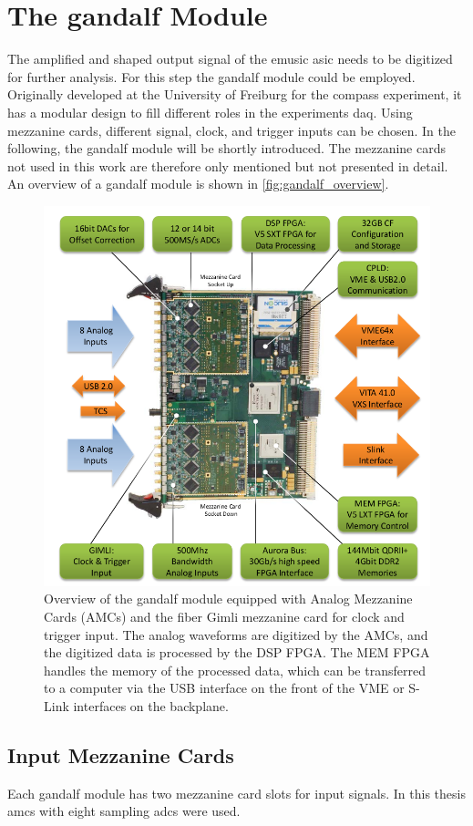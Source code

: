 \section{The \ac{gandalf} Module}
The amplified and shaped output signal of the \ac{emusic} \ac{asic} needs to be digitized for further analysis.
For this step the \ac{gandalf} module could be employed.
Originally developed at the University of Freiburg for the \ac{compass} experiment, it has a modular design to fill different roles in the experiments \ac{daq}.
Using mezzanine cards, different signal, clock, and trigger inputs can be chosen.
In the following, the \ac{gandalf} module will be shortly introduced.
The mezzanine cards not used in this work are therefore only mentioned but not presented in detail.
An overview of a \ac{gandalf} module is shown in \autoref{fig:gandalf_overview}.
\begin{figure}
	\centering
	\includegraphics[width=.8\textwidth]{pictures/gandalf_overview.png}
	\caption[Overview of the GANDALF module]{Overview of the \ac{gandalf} module equipped with Analog Mezzanine Cards (AMCs) and the fiber Gimli mezzanine card for clock and trigger input. The analog waveforms are digitized by the AMCs, and the digitized data is processed by the DSP FPGA. The MEM FPGA handles the memory of the processed data, which can be transferred to a computer via the USB interface on the front of the VME or S-Link interfaces on the backplane. \cite{Herrmann}}
	\label{fig:gandalf_overview}
\end{figure}

\subsection{Input Mezzanine Cards}
Each \ac{gandalf} module has two mezzanine card slots for input signals.
In this thesis \acp{amc} with eight sampling \acp{adc} were used.

